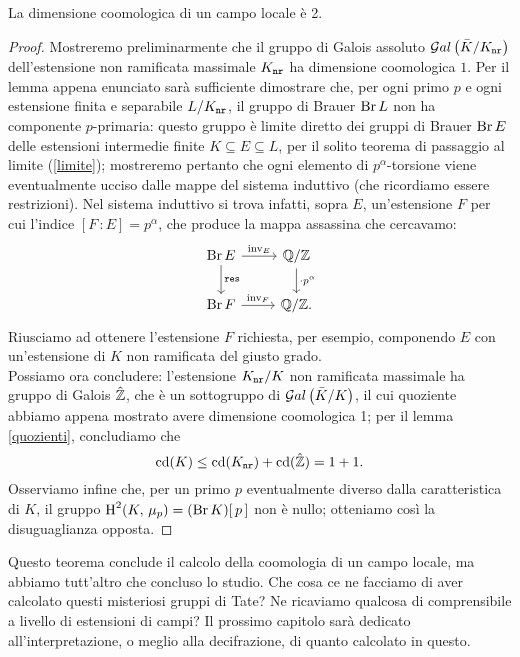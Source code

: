 \begin{theorem}\label{cdim2}
	La dimensione coomologica di un campo locale è 2.
\end{theorem}
\begin{proof}
	Mostreremo preliminarmente che il gruppo di Galois assoluto $ \mathcal{G}al\left( \bar{K}/K_\mathtt{nr} \right) $ dell'estensione non ramificata massimale $ K_\mathtt{nr} $ ha dimensione coomologica $ 1 $. Per il lemma appena enunciato sarà sufficiente dimostrare che, per ogni primo $ p $ e ogni estensione finita e separabile $ L/K_\mathtt{nr} $, il gruppo di Brauer $ \operatorname{Br} L $ non ha componente $ p $-primaria: questo gruppo è limite diretto dei gruppi di Brauer $ \operatorname{Br} E $ delle estensioni intermedie finite $ K \subseteq E \subseteq L $, per il solito teorema di passaggio al limite (\ref{limite}); mostreremo pertanto che ogni elemento di $ p^\alpha $-torsione viene eventualmente ucciso dalle mappe del sistema induttivo (che ricordiamo essere restrizioni). Nel sistema induttivo si trova infatti, sopra $ E $, un'estensione $ F $ per cui l'indice $ [F \,\colon E] = p^\alpha $, che produce la mappa assassina che cercavamo:
	\[ \begin{tikzcd}
	\Br E \rar["\inv_E"] \dar["\Res"]
	& \Q/\Z \dar["\cdot p^\alpha"] \\
	\Br F \rar["\inv_F"]
	& \Q/\Z.
	\end{tikzcd} \]
	Riusciamo ad ottenere l'estensione $ F $ richiesta, per esempio, componendo $ E $ con un'estensione di $ K $ non ramificata del giusto grado.\\
	
	Possiamo ora concludere: l'estensione $ K_\mathtt{nr} /K $ non ramificata massimale ha gruppo di Galois $ \hat{\mathbb{Z}} $, che è un sottogruppo di $ \mathcal{G}al\left( \bar{K}/K \right) $, il cui quoziente abbiamo appena mostrato avere dimensione coomologica 1; per il lemma \ref{quozienti}, concludiamo che 
	$$  \operatorname{cd}(K) \leq \operatorname{cd}(K_\mathtt{nr}) + \operatorname{cd}(\hat{\mathbb{Z}}) = 1+1.  $$
	Osserviamo infine che, per un primo $ p $ eventualmente diverso dalla caratteristica di $ K $, il gruppo $ \operatorname{H}^2(K, \, \mu_p) = (\operatorname{Br} K)[\, p\, ] $ non è nullo; otteniamo così la disuguaglianza opposta.
\end{proof}

Questo teorema conclude il calcolo della coomologia di un campo locale, ma abbiamo tutt'altro che concluso lo studio. Che cosa ce ne facciamo di aver calcolato questi misteriosi gruppi di Tate? Ne ricaviamo qualcosa di comprensibile a livello di estensioni di campi? Il prossimo capitolo sarà dedicato all'interpretazione, o meglio alla decifrazione, di quanto calcolato in questo.